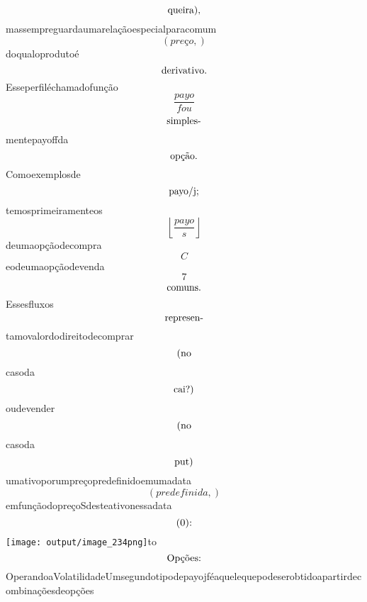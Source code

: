 \documentclass{article}
\begin{document}
\begin{equation}
$queira),$
\end{equation}massempreguardaumarelaçãoespecialparacomum\begin{equation}
\left( preço,\right)
\end{equation}doqualoprodutoé\begin{equation}
$derivativo.$
\end{equation}Esseperfiléchamadofunção\begin{equation}
\frac{payo}{fou}
\end{equation}\begin{equation}
$simples-$
\end{equation}mentepayoffda\begin{equation}
$opção.$
\end{equation}Comoexemplosde\begin{equation}
$payo/j;$
\end{equation}temosprimeiramenteos\begin{equation}
\left\lfloor{\frac{payo}{s}}\right\rfloor
\end{equation}deumaopçãodecompra\begin{equation}
C
\end{equation}eodeumaopçãodevenda\begin{equation}
7
\end{equation}\begin{equation}
$comuns.$
\end{equation}Essesfluxos\begin{equation}
$represen-$
\end{equation}tamovalordodireitodecomprar\begin{equation}
$(no$
\end{equation}casoda\begin{equation}
$cai?)$
\end{equation}oudevender\begin{equation}
$(no$
\end{equation}casoda\begin{equation}
$put)$
\end{equation}umativoporumpreçopredefinidoemumadata\begin{equation}
\left( predefinida,\right)
\end{equation}emfunçãodopreçoSdesteativonessadata\begin{equation}
$(0):$
\end{equation}\texttt{[image: output/image\_234png]}to\begin{equation}
$Opções:$
\end{equation}OperandoaVolatilidadeUmsegundotipodepayojféaquelequepodeserobtidoapartirdecombinaçõesdeopções\begin{equation}

\end{equation}
\end{document}
